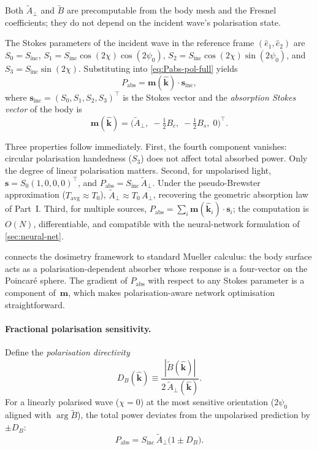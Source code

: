 \documentclass[11pt,a4paper]{article}
\theoremstyle{definition}      %
\newcommand{\khat}{\hat{\bm{k}}}
\newcommand{\Sinc}{S_{\mathrm{inc}}}
\newcommand{\Tavg}{T_{\mathrm{avg}}}
\newcommand{\Aperp}{A_{\perp}}
\begin{document}
Both $\tilde{A}_\perp$ and $\tilde{B}$ are precomputable from the
body mesh and the Fresnel coefficients; they do not depend on the
incident wave's polarisation state.

The Stokes parameters of the incident wave in the reference frame
$(\hat{e}_1,\hat{e}_2)$ are
$S_0 = \Sinc$,
$S_1 = \Sinc\cos(2\chi)\cos(2\psi_0)$,
$S_2 = \Sinc\cos(2\chi)\sin(2\psi_0)$, and
$S_3 = \Sinc\sin(2\chi)$.
Substituting into \cref{eq:Pabs-pol-full} yields
\begin{equation}\label{eq:Pabs-Stokes}
  \boxed{P_{\mathrm{abs}}
    = \mathbf{m}(\khat)\cdot\mathbf{s}_{\mathrm{inc}},}
\end{equation}
where $\mathbf{s}_{\mathrm{inc}} = (S_0,S_1,S_2,S_3)^\top$ is the
Stokes vector and the \emph{absorption Stokes vector} of the body is
\begin{equation}\label{eq:m-def}
  \mathbf{m}(\khat)
  = \bigl(\tilde{A}_\perp,\;
    -\tfrac{1}{2}B_c,\;
    -\tfrac{1}{2}B_s,\;
    0\bigr)^\top.
\end{equation}

Three properties follow immediately.
First, the fourth component vanishes: circular polarisation
handedness ($S_3$) does not affect total absorbed power.
Only the degree of linear polarisation matters.
Second, for unpolarised light,
$\mathbf{s} = S_0(1,0,0,0)^\top$, and
$P_{\mathrm{abs}} = \Sinc\,\tilde{A}_\perp$.  Under the
pseudo-Brewster approximation ($\Tavg\approx T_0$),
$\tilde{A}_\perp \approx T_0\,\Aperp$,
recovering the geometric absorption law of Part~I.
Third, for multiple sources,
$P_{\mathrm{abs}} = \sum_i\mathbf{m}(\khat_i)\cdot\mathbf{s}_i$;
the computation is $O(N)$, differentiable, and compatible with the
neural-network formulation of \cref{sec:neural-net}.

 connects the dosimetry framework
to standard Mueller calculus: the body surface acts as a
polarisation-dependent absorber whose response is a four-vector
on the Poincar\'e sphere.  The gradient of $P_{\mathrm{abs}}$
with respect to any Stokes parameter is a component
of~$\mathbf{m}$, which makes polarisation-aware network optimisation
straightforward.

\paragraph{Fractional polarisation sensitivity.}
Define the \emph{polarisation directivity}
\begin{equation}\label{eq:DB-def}
  D_B(\khat)
  \equiv \frac{|\tilde{B}(\khat)|}{2\,\tilde{A}_\perp(\khat)}.
\end{equation}
For a linearly polarised wave ($\chi=0$) at the most sensitive
orientation ($2\psi_0$ aligned with $\arg\tilde{B}$), the total
power deviates from the unpolarised prediction by $\pm D_B$:
\begin{equation}\label{eq:Pabs-DB}
  P_{\mathrm{abs}}
  = \Sinc\,\tilde{A}_\perp\bigl(1 \pm D_B\bigr).
\end{equation}
\end{document}
